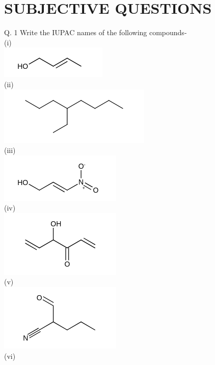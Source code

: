 \documentclass[10pt]{article}
\begin{document}
\section*{SUBJECTIVE QUESTIONS}
Q. 1 Write the IUPAC names of the following compounds-\\
(i)\\
\includegraphics{smile-3bc220d66a1f6ac7143b6c2031d0fbd89914fb4a}\\
(ii)\\
\includegraphics{smile-9822d0f106d6274d2db7c5f7f137fed7588f04c5}\\
(iii)\\
\includegraphics{smile-095cc9bf854452621bb9b4f4c2dbeef282eda345}\\
(iv)\\
\includegraphics{smile-a8de0832c4f66a1703f40bf0f2c509817f2d3b60}\\
(v)\\
\includegraphics{smile-4b908b939fe642d7ab698c1fb2668615eeee8ff2}\\
(vi)\\
\end{document}
